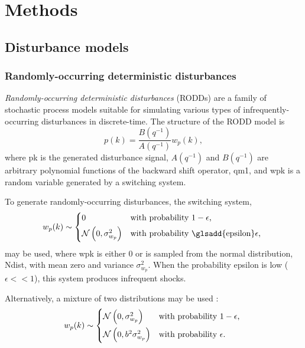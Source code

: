 \chapter{Methods}
\label{chap-methods}


\section{Disturbance models}

\subsection{Randomly-occurring deterministic disturbances}\label{subsec-RODD}

\textit{Randomly-occurring deterministic disturbances} (\gls{RODD}s) \citep{macgregor_duality_1984} are a family of stochastic process models suitable for simulating various types of infrequently-occurring disturbances in discrete-time.  The structure of the RODD model is
\begin{equation} \label{eq:RODD}
	p(k)= \frac{B(q^{-1})}{A(q^{-1})}w_p(k),
\end{equation}
where \gls{pk} is the generated disturbance signal, $A(q^{-1})$ and $B(q^{-1})$ are arbitrary polynomial functions of the backward shift operator, \gls{qm1}, and \gls{wpk} is a random variable generated by a switching system.

To generate randomly-occurring disturbances, the switching system,
\begin{equation} \label{eq:wpk1} 
w_p(k) \sim 
\begin{cases*}
	0 & with probability $1-\epsilon$, \\
	\mathcal{N}\left( 0, \sigma_{w_p}^2 \right) & with probability \glsadd{epsilon}$\epsilon$,
\end{cases*}
\end{equation}
may be used, where \gls{wpk} is either 0 or is sampled from the normal distribution, \gls{Ndist}, with mean zero and variance $\sigma_{w_p}^2$.  When the probability \gls{epsilon} is low ($\epsilon<<1$), this system produces infrequent shocks.

Alternatively, a mixture of two distributions may be used \citep{robertson_detection_1995}:
\begin{equation} \label{eq:wpk2}
w_p(k) \sim 
	\begin{cases*}
		\mathcal{N}\left(0, \sigma_{w_p}^2\right) & with probability $1-\epsilon$, \\
		\mathcal{N}\left(0, b^2\sigma_{w_p}^2\right) & with probability $\epsilon$.
	\end{cases*}
\end{equation}


